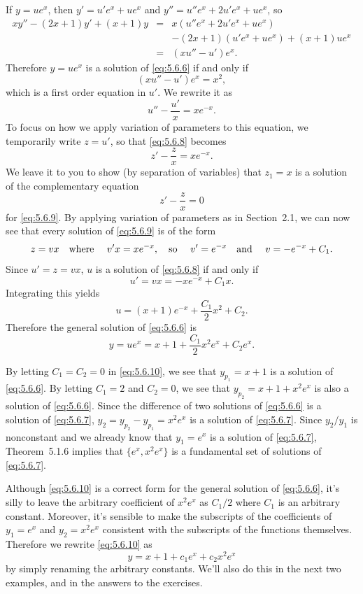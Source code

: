 \begin{examplesolution}
 If $y=ue^{x}$, then $y'=u'e^{x}+ue^{x}$ and $y''=u''e^{x}+2u'e^{x}+ue^{x}$, so
\begin{eqnarray*}
  xy''-(2x+1)y'+(x+1)y & = & x(u''e^{x}+2u'e^{x}+ue^{x})         \\
                       &   & -(2x+1)(u'e^{x}+ue^{x})+(x+1)ue^{x} \\
                       & = & (xu''-u')e^{x}.
\end{eqnarray*}
Therefore $y=ue^{x}$ is a solution of \eqref{eq:5.6.6} if and only if
\[
  (xu''-u')e^{x}=x^{2},
\]
which is a first order equation in $u'$. We rewrite it as
\begin{equation}
  \label{eq:5.6.8}u''-\frac{u'}{x}=xe^{-x}.
\end{equation}
To focus on how we apply variation of parameters to this equation, we temporarily write $z=u'$, so
that \eqref{eq:5.6.8} becomes
\begin{equation}
  \label{eq:5.6.9}z'-\frac{z}{x}=xe^{-x}.
\end{equation}
We leave it to you to show (by separation of variables) that $z_{1}=x$ is a solution of the
complementary equation
\[
  z'-\frac{z}{x}=0
\]
for \eqref{eq:5.6.9}. By applying variation of parameters as in Section~2.1, we can now see that
every solution of \eqref{eq:5.6.9} is of the form
\[
  z=vx\mbox{\quad where \quad}v'x=xe^{-x},\mbox{\quad so \quad}v'=e^{-x}\mbox{\quad and \quad}v=-e^{-x}+C_{1}.
\]
Since $u'=z=vx$, $u$ is a solution of \eqref{eq:5.6.8} if and only if
\[
  u'=vx=-xe^{-x}+C_{1}x.
\]
Integrating this yields
\[
  u=(x+1)e^{-x}+\frac{C_{1}}{2}x^{2}+C_{2}.
\]
Therefore the general solution of \eqref{eq:5.6.6} is
\begin{equation}
  \label{eq:5.6.10}y=ue^{x}=x+1+\frac{C_{1}}{2}x^{2}e^{x}+C_{2}e^{x}.
\end{equation}

 By letting $C_{1}=C_{2}=0$ in \eqref{eq:5.6.10}, we see that $y_{p_{1}}=x+1$ is a
solution of \eqref{eq:5.6.6}. By letting $C_{1}=2$ and $C_{2}=0$, we see that
$y_{p_{2}}=x+1+x^{2}e^{x}$ is also a solution of \eqref{eq:5.6.6}. Since the difference of two
solutions of \eqref{eq:5.6.6} is a solution of \eqref{eq:5.6.7},
$y_{2}=y_{p_{2}}-y_{p_{1}}=x^{2}e^{x}$ is a solution of \eqref{eq:5.6.7}. Since $y_{2}/y_{1}$ is
nonconstant and we already know that $y_{1}=e^{x}$ is a solution of \eqref{eq:5.6.7},
Theorem~5.1.6 implies that $\{e^{x},x^{2}e^{x}\}$ is a fundamental set of solutions of
\eqref{eq:5.6.7}.\bbox

Although \eqref{eq:5.6.10} is a correct form for the general solution of \eqref{eq:5.6.6}, it's
silly to leave the arbitrary coefficient of $x^{2}e^{x}$ as $C_{1}/2$ where $C_{1}$ is an arbitrary
constant. Moreover, it's sensible to make the subscripts of the coefficients of $y_{1}=e^{x}$ and
$y_{2}=x^{2}e^{x}$ consistent with the subscripts of the functions themselves. Therefore we rewrite
\eqref{eq:5.6.10} as
\[
  y=x+1+c_{1}e^{x}+c_{2}x^{2}e^{x}
\]
by simply renaming the arbitrary constants. We'll also do this in the next two examples, and in the
answers to the exercises.
\end{examplesolution}

